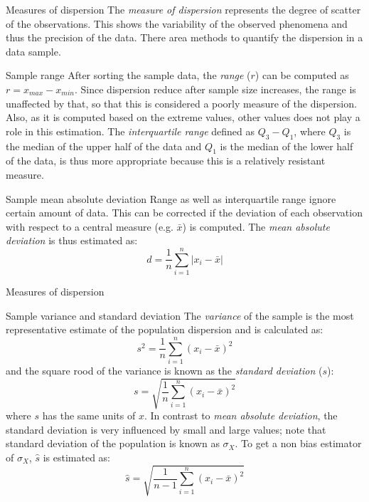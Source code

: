 \documentclass[8pt]{beamer}
\begin{document}
\begin{frame}{Measures of dispersion}
    The \emph{measure of dispersion} represents the degree of scatter of the observations. This shows the variability of the observed phenomena and thus the precision of the data. There area methods to quantify the dispersion in a data sample.

    \begin{block}{Sample range}
        After sorting the sample data, the \emph{range} ($r$) can be computed as $r = x_{max} - x_{min}$. Since dispersion reduce after sample size increases, the range is unaffected by that, so that this is considered  a poorly measure of the dispersion. Also, as it is computed based on the extreme values, other values does not play a role in this estimation. The  \emph{interquartile range} defined as $Q_3 - Q_1$,  where $Q_3$ is the median of the upper half of the data and $Q_1$ is the median of the lower half of the data, is thus more appropriate because this is a relatively resistant measure.
    \end{block}

    \begin{block}{Sample mean absolute deviation}
        Range as well as interquartile range ignore certain amount of data. This can be corrected if the deviation of each observation with respect to a central measure (e.g. $\bar{x}$) is computed. The \emph{mean absolute deviation} is thus estimated as:
        $$
        d = \frac{1}{n}\sum_{i=1}^n | x_i - \bar{x} |
        $$
    \end{block}
\end{frame}

\begin{frame}{Measures of dispersion}

    \begin{block}{Sample variance and standard deviation}
        The \emph{variance} of the sample is the most representative estimate of the population dispersion and is calculated as:
        $$
        s^2 = \frac{1}{n} \sum_{i=1}^n \left( x_i - \bar{x} \right)^2
        $$
        and the square rood of the variance is known as the \emph{standard deviation} ($s$):
        $$
        s = \sqrt{\frac{1}{n} \sum_{i=1}^n \left( x_i - \bar{x} \right)^2}
        $$
        where $s$ has the same units of $x$. In contrast to \emph{mean absolute deviation}, the standard deviation is very influenced by small and large values; note that standard deviation of the population is known as $\sigma_X$. To get a non bias estimator of $\sigma_X$, $\hat{s}$ is estimated as:
        $$
        \hat{s} = \sqrt{\frac{1}{n-1} \sum_{i=1}^n \left( x_i - \bar{x} \right)^2}
        $$
        
    \end{block}
\end{frame}
\end{document}
